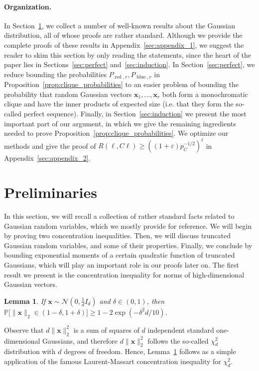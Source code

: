 \documentclass[11pt]{amsart}
\newtheorem{lemma}[theorem]{\bf Lemma}
\theoremstyle{definition}
\def\eps{\varepsilon}
\def\cN{\mathcal{N}}
\def\Pb{\mathbb{P}}
\def\bx{\boldsymbol{x}}
\DeclareMathOperator{\red}{red}
\DeclareMathOperator{\blue}{blue}
\begin{document}
\paragraph{Organization.} In Section~\ref{sec:prelims}, we collect a number of well-known results about the Gaussian distribution, all of whose proofs are rather standard. Although we provide the complete proofs of these results in Appendix~\ref{sec:appendix_1}, we suggest the reader to skim this section by only reading the statements, since the heart of the paper lies in Sections~\ref{sec:perfect} and~\ref{sec:induction}.
In Section~\ref{sec:perfect}, we reduce bounding the probabilities $P_{\red, r}, P_{\blue, r}$ in Proposition~\ref{prop:clique_probabilities} to an easier problem of bounding the probability that random Gaussian vectors $\bx_1, \dots, \bx_r$ both form a monochromatic clique and have the inner products of expected size (i.e. that they form the so-called perfect sequence). Finally, in Section~\ref{sec:induction} we present the most important part of our argument, in which we give the remaining ingredients needed to prove Proposition~\ref{prop:clique_probabilities}.
We optimize our methods and give the proof of $R(\ell, C\ell)\geq ((1+\eps)p_C^{-1/2})^{\ell}$ in Appendix~\ref{sec:appendix_2}. %

\section{Preliminaries}\label{sec:prelims}

In this section, we will recall a collection of rather standard facts related to Gaussian random variables, which we mostly provide for reference.
We will begin by proving two concentration inequalities. Then, we will discuss truncated Gaussian random variables, and some of their properties. Finally, we conclude by bounding exponential moments of a certain quadratic function of truncated Gaussians, which will play an important role in our proofs later on. The first result we present is the concentration inequality for norms of high-dimensional Gaussian vectors.

\begin{lemma}\label{lemma:norm_concentration}
If $\bx\sim \cN(0, \frac{1}{d}I_d)$ and $\delta\in (0, 1)$, then $\Pb\big[\|\bx\|_2\in (1-\delta, 1+\delta)\big]\geq 1-2\exp(-\delta^2 d/10)$.
\end{lemma}

\noindent
Observe that $d\|\bx\|_2^2$ is a sum of squares of $d$ independent standard one-dimensional Gaussians, and therefore $d\|\bx\|_2^2$ follows the so-called $\chi_d^2$ distribution with $d$ degrees of freedom. Hence, Lemma~\ref{lemma:norm_concentration} follows as a simple application of the famous Laurent-Massart concentration inequality for $\chi^2_d$.
\end{document}
